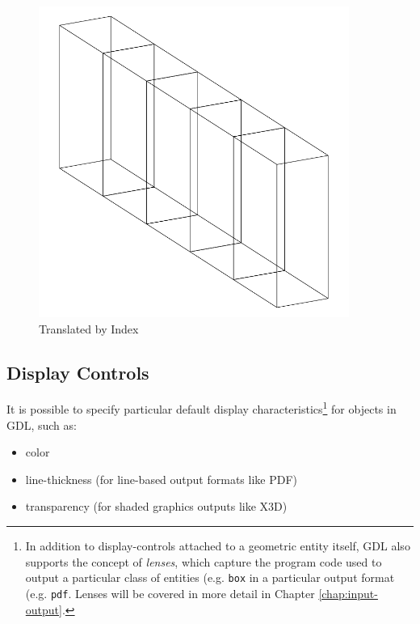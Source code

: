 \documentclass [11pt]{book}
\begin{document}
\begin{figure}
\begin{center}
\includegraphics[width=4in,height=4in]{../images/translate-by-index.pdf}
\end{center}

\caption{Translated by Index}

\label{fig:translate-by-index}

\end{figure}




\subsection{Display Controls}

\label{subsec:displaycontrols}



It is possible to specify particular default display
	 characteristics\footnote{In addition to display-controls attached to a geometric entity 
itself, GDL also supports the concept of \emph{lenses}, which capture the program code used to output a
		    particular class of  entities (e.g. \texttt{box} in a particular output format (e.g. \texttt{pdf}. Lenses will be covered in more detail in Chapter 
\ref{chap:input-output}.} for objects in GDL, such as: 

\begin{itemize}

\item color

\item line-thickness (for line-based output formats like PDF)

\item transparency (for shaded graphics outputs like X3D)

\end{itemize}
\end{document}
